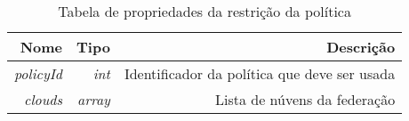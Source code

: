 \begin{table}[!htb]
    \centering
    \caption[resource-optimization-shape]{Tabela de propriedades da restrição da política
    \label{tab:constraint-shape}}
    \begin{tabular}{rrr}
        \toprule
            Nome & Tipo & Descrição \\ 
        \midrule
            \textit{policyId} & \textit{int} & Identificador da política que deve ser usada \\
            \textit{clouds} & \textit{array} & Lista de núvens da federação \\
        \bottomrule
    \end{tabular}
\end{table}

